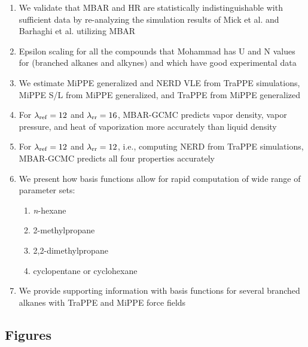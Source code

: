 \documentclass[journal=jced,manuscript=article]{achemso}
\begin{document}
\begin{enumerate}
	\item We validate that MBAR and HR are statistically indistinguishable with sufficient data by re-analyzing the simulation results of Mick et al. and Barhaghi et al. utilizing MBAR
	\item Epsilon scaling for all the compounds that Mohammad has U and N values for (branched alkanes and alkynes) and which have good experimental data
	\item We estimate MiPPE generalized and NERD VLE from TraPPE simulations, MiPPE S/L from MiPPE generalized, and TraPPE from MiPPE generalized
	\item For $\lambda_{\rm ref} = 12$ and $\lambda_{\rm rr} = 16$, MBAR-GCMC predicts vapor density, vapor pressure, and heat of vaporization more accurately than liquid density
	\item For $\lambda_{\rm ref} = 12$ and $\lambda_{\rm rr} = 12$, i.e., computing NERD from TraPPE simulations, MBAR-GCMC predicts all four properties accurately    
	\item We present how basis functions allow for rapid computation of wide range of parameter sets:
	\begin{enumerate}
		\item \textit{n}-hexane
		\item 2-methylpropane
		\item 2,2-dimethylpropane
		\item cyclopentane or cyclohexane
	\end{enumerate}
	\item We provide supporting information with basis functions for several branched alkanes with TraPPE and MiPPE force fields
\end{enumerate}

\subsection{Figures}
\end{document}
